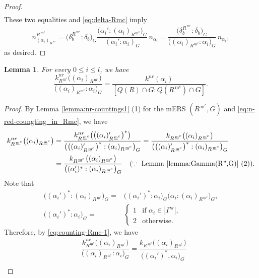 \documentclass[11pt]{amsart}
\newcommand{\mc}{\, \underline{\mathrm{m}}^c}
\newcommand{\w}{\mathrm{w}}
\newtheorem{lemma}[thm]{Lemma}%
\begin{document}
{\begin{proof}
\begin{align*}
\end{align*}
These two equalities and \eqref{eq:delta-Rmc} imply 
\begin{equation*}
n_{(\alpha_i)_{R^{\mc}}}^{R^{\mc}}=\big(\delta_b^{R^{\mc}}:\delta_b\big)_G
\dfrac{\big(\alpha_i':(\alpha_i)_{R^{\mc}}\big)_G}{(\alpha_i':\alpha_i)_G}\, n_{\alpha_i}
=\dfrac{\big(\delta_b^{R^{\mc}}:\delta_b\big)_G}
{\big((\alpha_i)_{R^{\mc}}:\alpha_i\big)_G}\, n_{\alpha_i},
\end{equation*}
as desired.
\end{proof}
\vskip 3mm
\noindent
\begin{lemma}
For every $0\leq i\leq l$, we have
\begin{equation}\label{eq:nr-counging-Rmc}
\dfrac{k_{R^{\mc}}^{nr}\big((\alpha_i)_{R^{\mc}}\big)}
{\big((\alpha_i)_{R^{\mc}}:\alpha_i\big)_G}
=\dfrac{k^{nr}(\alpha_i)}{[Q(R)\cap G:Q(R^{\mc})\cap G]}.
\end{equation}
\end{lemma}
\begin{proof}
By Lemma \ref{lemma:nr-countings1} (1) for 
the mERS $(R^{\mc},G)$ and \eqref{eq:n-red-coungting_in_Rmc}, we have
\begin{align*}
k_{R^{\mc}}^{nr}\big((\alpha_i)_{R^{\mc}}\big)&=
\dfrac{k_{R^{\mc}}^{nr}\big(\big((\alpha_i)_{R^{\mc}}'\big)^\ast\big)}
{\big(\big((\alpha_i)_{R^{\mc}}'\big)^\ast:(\alpha_i)_{R^{\mc}}\big)_G}
=\dfrac{k_{R^{\mc}}\big((\alpha_i)_{R^{\mc}}\big)}
{\big(\big((\alpha_i)_{R^{\mc}}'\big)^\ast:(\alpha_i)_{R^{\mc}}\big)_G}\\
&=\dfrac{k_{R^{\mc}}\big((\alpha_i)_{R^{\mc}}\big)}
{\big((\alpha_i')^\ast:(\alpha_i)_{R^{\mc}}\big)_G} \quad
(\because \ \text{Lemma \ref{lemma:Gamma(R'',G)} (2)}).
\end{align*}
Note that
\begin{align*}
\big((\alpha_i')^\ast:(\alpha_i)_{R^{\mc}}\big)_G=
&
\big((\alpha_i')^\ast:\alpha_i\big)_G
\big(\alpha_i:(\alpha_i)_{R^{\mc}}\big)_G, \\
\big((\alpha_i')^\ast : \alpha_i\big)_G
=
&\begin{cases}
1 & \text{if }\alpha_i\in |\Gamma^\w|,\\
2 & \text{otherwise}.
\end{cases}
\end{align*}
Therefore, by \eqref{eq:counting-Rmc-1}, we have
\begin{align*}
&\dfrac{k_{R^{\mc}}^{nr}\big((\alpha_i)_{R^{\mc}}\big)}
{\big((\alpha_i)_{R^{\mc}}:\alpha_i\big)_G}
=
\dfrac{k_{R^{\mc}}\big((\alpha_i)_{R^{\mc}}\big)}{\big((\alpha_i')^\ast,\alpha_i\big)_G}\\

\end{align*}
\end{proof}}
\end{document}
